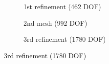 \begin{figure}[h!]
\begin{subfigure}[b]{0.4\linewidth}
{        }
        \caption{1st refinement (462 DOF)}
    \end{subfigure}
    \begin{subfigure}[b]{0.4\linewidth}
        \centering
        \caption{2nd mesh (992 DOF)}
    \end{subfigure}
    \begin{subfigure}[b]{0.4\linewidth}
        \centering
        \caption{3rd refinement (1780 DOF)}
    \end{subfigure}
\end{figure}

\pagebreak